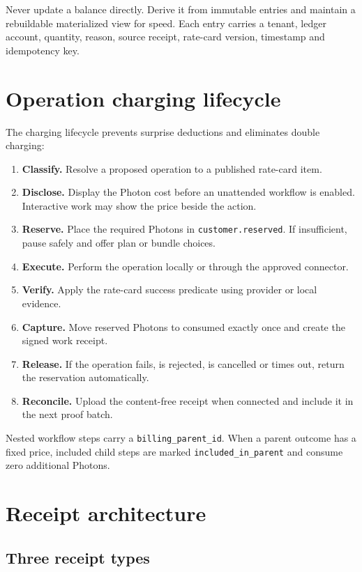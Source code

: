 \documentclass[11pt]{article}
\newcommand{\code}[1]{\texttt{#1}}
\begin{document}
Never update a balance directly. Derive it from immutable entries and maintain a rebuildable materialized view for speed. Each entry carries a tenant, ledger account, quantity, reason, source receipt, rate-card version, timestamp and idempotency key.

\section{Operation charging lifecycle}

The charging lifecycle prevents surprise deductions and eliminates double charging:

\begin{enumerate}
  \item \textbf{Classify.} Resolve a proposed operation to a published rate-card item.
  \item \textbf{Disclose.} Display the Photon cost before an unattended workflow is enabled. Interactive work may show the price beside the action.
  \item \textbf{Reserve.} Place the required Photons in \code{customer.reserved}. If insufficient, pause safely and offer plan or bundle choices.
  \item \textbf{Execute.} Perform the operation locally or through the approved connector.
  \item \textbf{Verify.} Apply the rate-card success predicate using provider or local evidence.
  \item \textbf{Capture.} Move reserved Photons to consumed exactly once and create the signed work receipt.
  \item \textbf{Release.} If the operation fails, is rejected, is cancelled or times out, return the reservation automatically.
  \item \textbf{Reconcile.} Upload the content-free receipt when connected and include it in the next proof batch.
\end{enumerate}

Nested workflow steps carry a \code{billing\_parent\_id}. When a parent outcome has a fixed price, included child steps are marked \code{included\_in\_parent} and consume zero additional Photons.

\section{Receipt architecture}

\subsection{Three receipt types}
\end{document}
